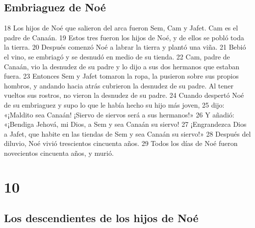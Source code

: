 \section{Embriaguez de Noé}

18 Los hijos de Noé que salieron del arca fueron Sem, Cam y Jafet. Cam es el padre de Canaán. 19 Estos tres fueron los hijos de Noé, y de ellos se pobló toda la tierra.
20 Después comenzó Noé a labrar la tierra y plantó una viña.
21 Bebió el vino, se embriagó y se desnudó en medio de su tienda.
22 Cam, padre de Canaán, vio la desnudez de su padre y lo dijo a sus dos hermanos que estaban fuera.
23 Entonces Sem y Jafet tomaron la ropa, la pusieron sobre sus propios hombros, y andando hacia atrás cubrieron la desnudez de su padre. Al tener vueltos sus rostros, no vieron la desnudez de su padre.
24 Cuando despertó Noé de su embriaguez y supo lo que le había hecho su hijo más joven,
25 dijo:
«¡Maldito sea Canaán!
¡Siervo de siervos será a sus hermanos!»
26 Y añadió:
«¡Bendiga Jehová, mi Dios, a Sem
y sea Canaán su siervo!
27 ¡Engrandezca Dios a Jafet,
que habite en las tiendas de Sem
y sea Canaán su siervo!»
28 Después del diluvio, Noé vivió trescientos cincuenta años. 29 Todos los días de Noé fueron novecientos cincuenta años, y murió.

\chapter{10}

\section{Los descendientes de los hijos de Noé}

